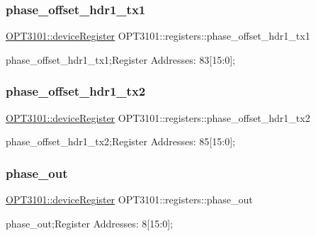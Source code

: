 \subsubsection{\texorpdfstring{phase\+\_\+offset\+\_\+hdr1\+\_\+tx1}{phase\_offset\_hdr1\_tx1}}
{\footnotesize\ttfamily \mbox{\hyperlink{class_o_p_t3101_1_1device_register}{O\+P\+T3101\+::device\+Register}} O\+P\+T3101\+::registers\+::phase\+\_\+offset\+\_\+hdr1\+\_\+tx1}



phase\+\_\+offset\+\_\+hdr1\+\_\+tx1;Register Addresses\+: 83\mbox{[}15\+:0\mbox{]}; 

\mbox{\label{class_o_p_t3101_1_1registers_a93c4864a0cb0b3ff977feb3616602d88}} 
\subsubsection{\texorpdfstring{phase\+\_\+offset\+\_\+hdr1\+\_\+tx2}{phase\_offset\_hdr1\_tx2}}
{\footnotesize\ttfamily \mbox{\hyperlink{class_o_p_t3101_1_1device_register}{O\+P\+T3101\+::device\+Register}} O\+P\+T3101\+::registers\+::phase\+\_\+offset\+\_\+hdr1\+\_\+tx2}



phase\+\_\+offset\+\_\+hdr1\+\_\+tx2;Register Addresses\+: 85\mbox{[}15\+:0\mbox{]}; 

\mbox{\label{class_o_p_t3101_1_1registers_a0b410cb503df506724a4b6a1da49ce1e}} 
\subsubsection{\texorpdfstring{phase\+\_\+out}{phase\_out}}
{\footnotesize\ttfamily \mbox{\hyperlink{class_o_p_t3101_1_1device_register}{O\+P\+T3101\+::device\+Register}} O\+P\+T3101\+::registers\+::phase\+\_\+out}



phase\+\_\+out;Register Addresses\+: 8\mbox{[}15\+:0\mbox{]}; 

